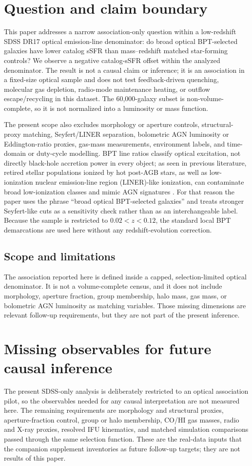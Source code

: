 \documentclass[twocolumn]{aastex631}
\begin{document}
\section{Question and claim boundary}
This paper addresses a narrow association-only question within a low-redshift SDSS DR17 optical emission-line denominator: do broad optical BPT-selected galaxies have lower catalog sSFR than mass--redshift matched star-forming controls? We observe a negative catalog-sSFR offset within the analyzed denominator. The result is not a causal claim or inference; it is an association in a fixed-size optical sample and does not test feedback-driven quenching, molecular gas depletion, radio-mode maintenance heating, or outflow escape/recycling in this dataset. The 60,000-galaxy subset is non-volume-complete, so it is not normalized into a luminosity or mass function.


The present scope also excludes morphology or aperture controls, structural-proxy matching, Seyfert/LINER separation, bolometric AGN luminosity or Eddington-ratio proxies, gas-mass measurements, environment labels, and time-domain or duty-cycle modelling. BPT line ratios classify optical excitation, not directly black-hole accretion power in every object; as seen in previous literature, retired stellar populations ionized by hot post-AGB stars, as well as low-ionization nuclear emission-line region (LINER)-like ionization, can contaminate broad low-ionization classes and mimic AGN signatures \citep{cidfernandes2011,stasinska2008,stasinska2015}. For that reason the paper uses the phrase ``broad optical BPT-selected galaxies'' and treats stronger Seyfert-like cuts as a sensitivity check rather than as an interchangeable label. Because the sample is restricted to $0.02<z<0.12$, the standard local BPT demarcations are used here without any redshift-evolution correction.

\subsection{Scope and limitations}
The association reported here is defined inside a capped, selection-limited optical denominator. It is not a volume-complete census, and it does not include morphology, aperture fraction, group membership, halo mass, gas mass, or bolometric AGN luminosity as matching variables. Those missing dimensions are relevant follow-up requirements, but they are not part of the present inference.

\section{Missing observables for future causal inference}
The present SDSS-only analysis is deliberately restricted to an optical association pilot, so the observables needed for any causal interpretation are not measured here. The remaining requirements are morphology and structural proxies, aperture-fraction control, group or halo membership, CO/HI gas masses, radio and X-ray proxies, resolved IFU kinematics, and matched simulation comparisons passed through the same selection function. These are the real-data inputs that the companion supplement inventories as future follow-up targets; they are not results of this paper.
\end{document}
